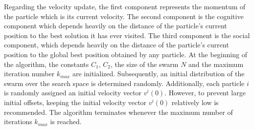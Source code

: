 \newline
\newline
Regarding the velocity update, the first component represents the momentum of the particle which is its current velocity. The second component is the cognitive component which depends heavily on the distance of the particle's current position to the best solution it has ever visited. The third component is the social component, which depends heavily on the distance of the particle's current position to the global best position obtained by any particle. At the beginning of the algorithm, the constants $C_{1}$, $C_{2}$, the size of the swarm $N$ and the maximum iteration number $k_{max}$ are initialized. Subsequently, an initial distribution of the swarm over the search space is determined randomly. Additionally, each particle $i$ is randomly assigned an initial velocity vector $v^{i}(0)$. However, to prevent large initial offsets, keeping the initial velocity vector $v^{i}(0)$ relatively low is recommended. The algorithm terminates whenever the maximum number of iterations $k_{max}$ is reached. 
























